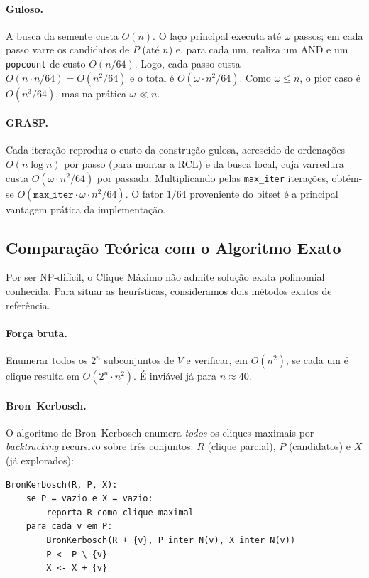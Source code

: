 \documentclass[12pt]{article}
\begin{document}
\paragraph{Guloso.} A busca da semente custa $O(n)$. O laço principal executa
até $\omega$ passos; em cada passo varre os candidatos de $P$ (até $n$) e, para
cada um, realiza um AND e um \texttt{popcount} de custo $O(n/64)$. Logo, cada
passo custa $O(n \cdot n/64) = O(n^2/64)$ e o total é
$O(\omega \cdot n^2/64)$. Como $\omega \leq n$, o pior caso é
$O(n^3/64)$, mas na prática $\omega \ll n$.

\paragraph{GRASP.} Cada iteração reproduz o custo da construção gulosa, acrescido
de ordenações $O(n \log n)$ por passo (para montar a RCL) e da busca local, cuja
varredura custa $O(\omega \cdot n^2/64)$ por passada. Multiplicando pelas
\texttt{max\_iter} iterações, obtém-se
$O(\texttt{max\_iter} \cdot \omega \cdot n^2/64)$. O fator $1/64$ proveniente do
bitset é a principal vantagem prática da implementação.

\subsection{Comparação Teórica com o Algoritmo Exato}

Por ser NP-difícil, o Clique Máximo não admite solução exata polinomial
conhecida. Para situar as heurísticas, consideramos dois métodos exatos de
referência.

\paragraph{Força bruta.} Enumerar todos os $2^n$ subconjuntos de $V$ e verificar,
em $O(n^2)$, se cada um é clique resulta em $O(2^n \cdot n^2)$. É inviável já
para $n \approx 40$.

\paragraph{Bron--Kerbosch.} O algoritmo de Bron--Kerbosch
\cite{bron1973} enumera \emph{todos} os cliques maximais por
\emph{backtracking} recursivo sobre três conjuntos: $R$ (clique parcial),
$P$ (candidatos) e $X$ (já explorados):

\begin{verbatim}
BronKerbosch(R, P, X):
    se P = vazio e X = vazio:
        reporta R como clique maximal
    para cada v em P:
        BronKerbosch(R + {v}, P inter N(v), X inter N(v))
        P <- P \ {v}
        X <- X + {v}
\end{verbatim}
\end{document}
